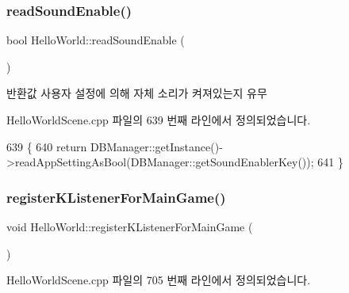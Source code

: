 \subsubsection{\texorpdfstring{read\+Sound\+Enable()}{readSoundEnable()}}
{\footnotesize\ttfamily bool Hello\+World\+::read\+Sound\+Enable (\begin{DoxyParamCaption}{ }\end{DoxyParamCaption})\hspace{0.3cm}{\ttfamily [protected]}}

\begin{DoxyReturn}{반환값}
사용자 설정에 의해 자체 소리가 켜져있는지 유무 
\end{DoxyReturn}


Hello\+World\+Scene.\+cpp 파일의 639 번째 라인에서 정의되었습니다.


\begin{DoxyCode}
639                                 \{
640     \textcolor{keywordflow}{return} DBManager::getInstance()->readAppSettingAsBool(DBManager::getSoundEnablerKey());
641 \}
\end{DoxyCode}
\mbox{\label{class_hello_world_a15deb2e6546d6fd41267dc91932ade26}} 
\subsubsection{\texorpdfstring{register\+K\+Listener\+For\+Main\+Game()}{registerKListenerForMainGame()}}
{\footnotesize\ttfamily void Hello\+World\+::register\+K\+Listener\+For\+Main\+Game (\begin{DoxyParamCaption}{ }\end{DoxyParamCaption})\hspace{0.3cm}{\ttfamily [protected]}}



Hello\+World\+Scene.\+cpp 파일의 705 번째 라인에서 정의되었습니다.


